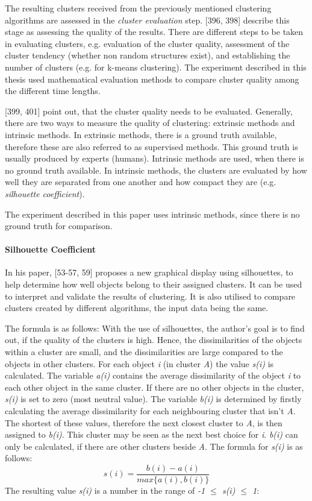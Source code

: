 The resulting clusters received from the previously mentioned clustering algorithms are assessed in the \textit{cluster evaluation} step. \textcite{han2011data}[396, 398] describe this stage as assessing the quality of the results.
There are different steps to be taken in evaluating clusters, e.g. evaluation of the cluster quality, assessment of the cluster tendency (whether non random structures exist), and establishing the number of clusters (e.g. for k-means clustering). The experiment described in this thesis used mathematical evaluation methods to compare cluster quality among the different time lengths. 
 

\textcite{han2011data}[399, 401] point out, that the cluster quality needs to be evaluated. Generally, there are two ways to measure the quality of clustering: extrinsic methods and intrinsic methods. In extrinsic methods, there is a ground truth available, therefore these are also referred to as supervised methods. This ground truth is usually produced by experts (humans). Intrinsic methods are used, when there is no ground truth available. In intrinsic methods, the clusters are evaluated by how well they are separated from one another and how compact they are (e.g. \textit{silhouette coefficient}).

The experiment described in this paper uses intrinsic methods, since there is no ground truth for comparison.


\paragraph{Silhouette Coefficient}
\label{section:silhouetteCoefficient}
In his paper, \textcite{rousseeuw1987silhouettes}[53-57, 59] proposes a new graphical display using silhouettes, to help determine how well objects belong to their assigned clusters. It can be used to interpret and validate the results of clustering. It is also utilised to compare clusters created by different algorithms, the input data being the same.

The formula is as follows:
With the use of silhouettes, the author's goal is to find out, if the quality of the clusters is high. Hence, the dissimilarities of the objects within a cluster are small, and the dissimilarities are large compared to the objects in other clusters. For each object \textit{i} (in cluster \textit{A}) the value \textit{s(i)} is calculated. The variable \textit{a(i)} contains the average dissimilarity of the object \textit{i} to each other object in the same cluster. If there are no other objects in the cluster, \textit{s(i)} is set to zero (most neutral value). The variable \textit{b(i)} is determined by firstly calculating the average dissimilarity for each neighbouring cluster that isn't \textit{A}. The shortest of these values, therefore the next closest cluster to \textit{A}, is then assigned to \textit{b(i)}. This cluster may be seen as the next best choice for \textit{i}. \textit{b(i)} can only be calculated, if there are other clusters beside \textit{A}. The formula for \textit{s(i)} is as follows:
\[
  s(i) = \frac{b(i) - a(i)}{max\{a(i), b(i)\}}  
\]
The resulting value \textit{s(i)} is a number in the range of \textit{-1 $\leq$ \textit{s(i)} $\leq$ 1}:

